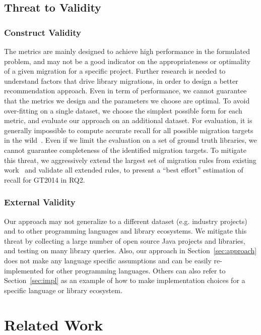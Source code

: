 \documentclass[conference, 10pt]{IEEEtran}
\begin{document}
\subsection{Threat to Validity}

\subsubsection{Construct Validity}

The metrics are mainly designed to achieve high performance in the formulated problem, and may not be a good indicator on the appropriateness or optimality of a given migration for a specific project.
Further research is needed to understand factors that drive library migrations, in order to design a better recommendation approach.
Even in term of performance, we cannot guarantee that the metrics we design and the parameters we choose are optimal.
To avoid over-fitting on a single dataset, we choose the simplest possible form for each metric, and evaluate our approach on an additional dataset.
For evaluation, it is generally impossible to compute accurate recall for all possible migration targets in the wild~\cite{2012WCRE-Teyton-Mining, 2014JournalOfSysAndSoft-Teyton-Study}. 
Even if we limit the evaluation on a set of ground truth libraries, we cannot guarantee completeness of the identified migration targets.
To mitigate this threat, we aggressively extend the largest set of migration rules from existing work~\cite{2014JournalOfSysAndSoft-Teyton-Study} and validate all extended rules, to present a ``best effort'' estimation of recall for GT2014 in RQ2.

\subsubsection{External Validity} 

Our approach may not generalize to a different dataset (e.g. industry projects) and to other programming languages and library ecosystems.
We mitigate this threat by collecting a large number of open source Java projects and libraries, and testing on many library queries. Also, our approach in Section~\ref{sec:approach} does not make any language specific assumptions and can be easily re-implemented for other programming languages. Others can also refer to Section~\ref{sec:impl} as an example of how to make implementation choices for a specific language or library ecosystem.

\section{Related Work}
\label{sec:related-work}
\end{document}
